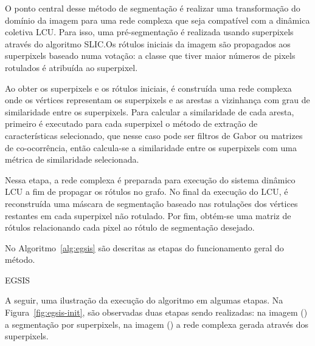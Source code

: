 O ponto central desse método de segmentação é realizar uma
transformação do domínio da imagem para uma rede complexa que seja
compatível com a dinâmica coletiva \gls{LCU}. Para isso, uma
pré-segmentação é realizada usando superpixels através do algoritmo
SLIC.\@ Os rótulos iniciais da imagem são propagados aos superpixels
baseado numa votação: a classe que tiver maior números de pixels
rotulados é atribuída ao superpixel.

Ao obter os superpixels e os rótulos iniciais, é construída uma rede
complexa onde os vértices representam os superpixels e as arestas a
vizinhança com grau de similaridade entre os superpixels. Para
calcular a similaridade de cada aresta, primeiro é executado para cada
superpixel o método de extração de características selecionado, que
nesse caso pode ser filtros de Gabor ou matrizes de co-ocorrência,
então calcula-se a similaridade entre os superpixels com uma métrica
de similaridade selecionada.

Nessa etapa, a rede complexa é preparada para execução do sistema
dinâmico \gls{LCU} a fim de propagar os rótulos no grafo. No final da
execução do \gls{LCU}, é reconstruída uma máscara de segmentação
baseado nas rotulações dos vértices restantes em cada superpixel
não rotulado. Por fim, obtém-se uma matriz de rótulos relacionando
cada pixel ao rótulo de segmentação desejado.

No Algoritmo~\ref{alg:egsis} são descritas as etapas do funcionamento
geral do método.

\begin{algorithm}[h!]
	\SetSpacedAlgorithm{}
	\caption{\label{alg:egsis} EGSIS}
\end{algorithm}
\FloatBarrier{}

A seguir, uma ilustração da execução do algoritmo em algumas etapas. Na
Figura~\ref{fig:egsis-init}, são observadas duas etapas sendo
realizadas: na imagem () a segmentação
por superpixels, na imagem () a rede
complexa gerada através dos superpixels.


